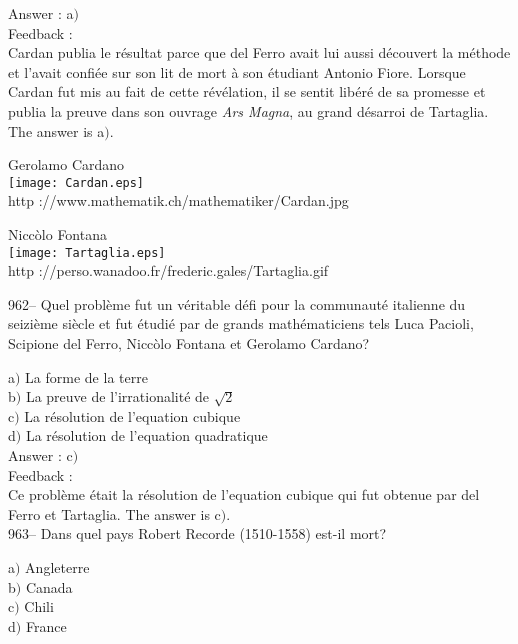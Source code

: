 \documentclass[letterpaper, 12pt]{article}
\begin{document}
Answer : a$)$\\

Feedback : \\
Cardan publia le r\'esultat parce que del Ferro avait lui aussi
d\'ecouvert la m\'ethode et l'avait confi\'ee sur son lit de mort
\`a son \'etudiant Antonio Fiore. Lorsque Cardan fut mis au fait de
cette r\'ev\'elation, il se sentit lib\'er\'e de sa promesse et
publia la preuve dans son ouvrage
{\sl Ars Magna}, au grand d\'esarroi de Tartaglia. The answer is a$)$.\\

        \begin{center}
        Gerolamo Cardano\\
    \texttt{[image: Cardan.eps]}\\
        {\footnotesize http ://www.mathematik.ch/mathematiker/Cardan.jpg}
    \end{center}

        \begin{center}
        Nicc\`olo Fontana\\
    \texttt{[image: Tartaglia.eps]}\\
        {\footnotesize http
://perso.wanadoo.fr/frederic.gales/Tartaglia.gif}
    \end{center}

962-- Quel probl\`eme fut un v\'eritable d\'efi pour la communaut\'e
italienne du seizi\`eme si\`ecle et fut \'etudi\'e par de grands
math\'ematiciens tels Luca Pacioli, Scipione del Ferro, Nicc\`olo
Fontana et Gerolamo Cardano?

a$)$ La forme de la terre \\
b$)$ La preuve de l'irrationalit\'e de $\sqrt2$ \\
c$)$ La r\'esolution de l'equation cubique  \\
d$)$ La r\'esolution de l'equation quadratique \\

Answer : c$)$\\

Feedback : \\
Ce probl\`eme \'etait la r\'esolution de l'equation cubique qui
fut obtenue
par del Ferro et Tartaglia. The answer is c$)$.\\

963-- Dans quel pays Robert Recorde (1510-1558) est-il mort?

a$)$ Angleterre \\
b$)$ Canada  \\
c$)$ Chili \\
d$)$ France\\
\end{document}
